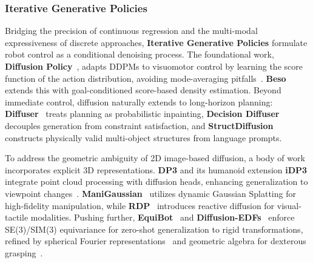 \documentclass[acmsmall,screen,review,anonymous]{acmart}
\begin{document}
\subsubsection{Iterative Generative Policies}\label{sec:iterative_generative_policies}

Bridging the precision of continuous regression and the multi-modal expressiveness of discrete approaches, \textbf{Iterative Generative Policies} formulate robot control as a conditional denoising process. The foundational work, \textbf{Diffusion Policy}~\cite{bekris2023diffusion}, adapts DDPMs to visuomotor control by learning the score function of the action distribution, avoiding mode-averaging pitfalls~\cite{diffusion_bc_2023}. \textbf{Beso}~\cite{beso_2023} extends this with goal-conditioned score-based density estimation. Beyond immediate control, diffusion naturally extends to long-horizon planning: \textbf{Diffuser}~\cite{diffuser_2022} treats planning as probabilistic inpainting, \textbf{Decision Diffuser}~\cite{decision_diffuser_2023} decouples generation from constraint satisfaction, and \textbf{StructDiffusion}~\cite{structdiffusion_2023} constructs physically valid multi-object structures from language prompts.

To address the geometric ambiguity of 2D image-based diffusion, a body of work incorporates explicit 3D representations. \textbf{DP3} and its humanoid extension \textbf{iDP3} integrate point cloud processing with diffusion heads, enhancing generalization to viewpoint changes~\cite{dp3_2024, idp3_2024}. \textbf{ManiGaussian}~\cite{lu2024manigaussian} utilizes dynamic Gaussian Splatting for high-fidelity manipulation, while \textbf{RDP}~\cite{xue2025reactive} introduces reactive diffusion for visual-tactile modalities. Pushing further, \textbf{EquiBot}~\cite{equibot_2025} and \textbf{Diffusion-EDFs}~\cite{diffusion_edfs_2024} enforce SE(3)/SIM(3) equivariance for zero-shot generalization to rigid transformations, refined by spherical Fourier representations~\cite{spherical_fourier_2025} and geometric algebra for dexterous grasping~\cite{sun2025hybrid_pga,zhong2025gagrasp}.
\end{document}

